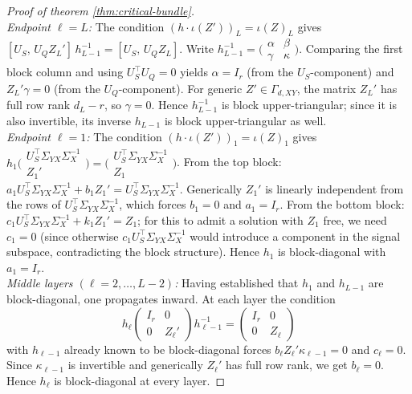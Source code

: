 \documentclass{article}
\theoremstyle{definition}
\begin{document}
\begin{proof}[Proof of theorem \ref{thm:critical-bundle}]
\\
\emph{Endpoint $\ell = L$:}  The condition $(h \cdot \iota(Z'))_L = \iota(Z)_L$ gives $[U_S,\, U_Q Z_L']\, h_{L-1}^{-1} = [U_S,\, U_Q Z_L]$.  Write $h_{L-1}^{-1} = \bigl(\begin{smallmatrix} \alpha & \beta \\ \gamma & \kappa \end{smallmatrix}\bigr)$.  Comparing the first block column and using $U_S^\top U_Q = 0$ yields $\alpha = I_r$ (from the $U_S$-component) and $Z_L' \gamma = 0$ (from the $U_Q$-component).  For generic $Z' \in \Gamma_{d,XY}$, the matrix $Z_L'$ has full row rank $d_L - r$, so $\gamma = 0$.  Hence $h_{L-1}^{-1}$ is block upper-triangular; since it is also invertible, its inverse $h_{L-1}$ is block upper-triangular as well.
\\
\noindent
\emph{Endpoint $\ell = 1$:}  The condition $(h \cdot \iota(Z'))_1 = \iota(Z)_1$ gives $h_1 \bigl(\begin{smallmatrix} U_S^\top \Sigma_{YX}\Sigma_X^{-1} \\ Z_1' \end{smallmatrix}\bigr) = \bigl(\begin{smallmatrix} U_S^\top \Sigma_{YX}\Sigma_X^{-1} \\ Z_1 \end{smallmatrix}\bigr)$.  From the top block: $a_1 U_S^\top \Sigma_{YX}\Sigma_X^{-1} + b_1 Z_1' = U_S^\top \Sigma_{YX}\Sigma_X^{-1}$.  Generically $Z_1'$ is linearly independent from the rows of $U_S^\top \Sigma_{YX}\Sigma_X^{-1}$, which forces $b_1 = 0$ and $a_1 = I_r$.  From the bottom block: $c_1 U_S^\top \Sigma_{YX}\Sigma_X^{-1} + k_1 Z_1' = Z_1$; for this to admit a solution with $Z_1$ free, we need $c_1 = 0$ (since otherwise $c_1 U_S^\top \Sigma_{YX}\Sigma_X^{-1}$ would introduce a component in the signal subspace, contradicting the block structure).  Hence $h_1$ is block-diagonal with $a_1 = I_r$.
\noindent
\\
\emph{Middle layers $(\ell = 2, \dots, L{-}2)$:}  Having established that $h_1$ and $h_{L-1}$ are block-diagonal, one propagates inward.  At each layer the condition
\[
h_\ell \begin{pmatrix} I_r & 0 \\ 0 & Z_\ell' \end{pmatrix} h_{\ell-1}^{-1}
= \begin{pmatrix} I_r & 0 \\ 0 & Z_\ell \end{pmatrix}
\]
with $h_{\ell-1}$ already known to be block-diagonal forces $b_\ell Z_\ell' \kappa_{\ell-1} = 0$ and $c_\ell = 0$.  Since $\kappa_{\ell-1}$ is invertible and generically $Z_\ell'$ has full row rank, we get $b_\ell = 0$.  Hence $h_\ell$ is block-diagonal at every layer.

\end{proof}
\end{document}

